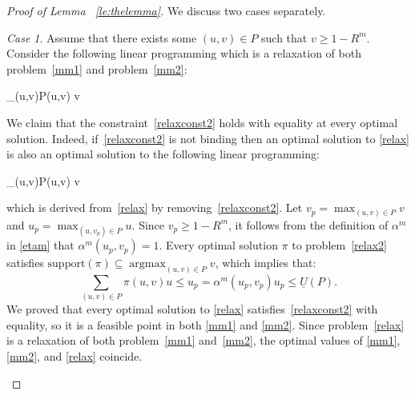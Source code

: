 \documentclass[12pt,english]{article}
\DeclareMathOperator*{\argmax}{argmax}
\newcommand{\support}{\text{support}}
\newcommand{\underU}{{\underline{U}}}
\theoremstyle{remark}
\newtheorem{case}{Case}
\newenvironment{proofof}[1]{\begin{proof}[Proof of #1]}{\end{proof}}
\theoremstyle{plain}
\theoremstyle{definition}
\begin{document}
\begin{proofof}{Lemma ~\ref{le:thelemma}}
We discuss two cases separately. 
\begin{case}Assume that there exists some $(u,v)\in P$ such that $v\geqslant1-R^m$. Consider the following linear programming which is a relaxation of both problem~\eqref{mm1} and problem~\eqref{mm2}: 
\begin{maxi!}[2]{\pi}{\sum_{(u,v)\in P}\pi(u,v) v} {\label{relax}} {}\addConstraint{\sum_{(u,v)\in P}\pi(u,v)u}{\geqslant\underU(P).\label{relaxconst2}}\end{maxi!}
We claim that the constraint~\eqref{relaxconst2} holds with equality at every optimal solution. Indeed, if~\eqref{relaxconst2} is not binding then an optimal solution to \eqref{relax} is also an optimal solution to the following linear programming:
\begin{maxi!}[2]{\pi}{\sum_{(u,v)\in P}\pi(u,v) v} {\label{relax2}} {}\end{maxi!}
which is derived from~\eqref{relax} by removing~\eqref{relaxconst2}. Let $v_p = \max_{(u,v)\in P} v$ and $u_p = \max_{(u,v_p)\in P} u$. Since $v_p\geqslant1-R^m$, it follows from  the definition of $\alpha^m$ in \eqref{etam} that $\alpha^m(u_p,v_p)=1$. Every optimal solution $\pi$ to problem~\eqref{relax2} satisfies $\support(\pi)\subseteq \argmax_{(u,v)\in P}v$, which implies that: 
\[
\sum_{(u,v)\in P}\pi(u,v)u\leqslant u_p=\alpha^m(u_p,v_p)u_p\leqslant \underU(P).
\] 
We proved that every optimal solution to \eqref{relax} satisfies~\eqref{relaxconst2} with equality, so it is a feasible point in both \eqref{mm1} and \eqref{mm2}. Since problem~\eqref{relax} is a relaxation of both problem~\eqref{mm1} and~\eqref{mm2}, the optimal values of \eqref{mm1}, \eqref{mm2}, and \eqref{relax} coincide. %

\end{case}
\end{proofof}
\end{document}
